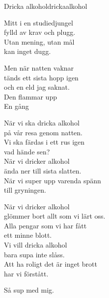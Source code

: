 \begin{song}{Dricka alkohol}{drickaalkohol}
\begin{vers}
Mitt i en studiedjungel\\
fylld av krav och plugg.\\
Utan mening, utan mål\\
kan inget dugg.\\
\end{vers}
\begin{vers}
Men när natten vaknar\\
tänds ett sista hopp igen\\
och en eld jag saknat.\\
Den flammar upp\\
En gång\\
\end{vers}
\begin{vers}
När vi ska dricka alkohol\\
på vår resa genom natten.\\
Vi ska färdas i ett rus igen\\
vad hände sen?\\
När vi dricker alkohol\\
ända ner till sista slatten.\\
När vi super upp varenda spänn\\
till gryningen.\\
\end{vers}
\newp
\begin{vers}
När vi dricker alkohol\\
glömmer bort allt som vi lärt oss.\\
Alla pengar som vi har fått\\
ett minne blott.\\
Vi vill dricka alkohol\\
bara supa inte slåss.\\
Att ha roligt det är inget brott\\
har vi förstått.\\
\end{vers}
\begin{vers}
Så sup med mig.\\
\end{vers}
\end{song}
